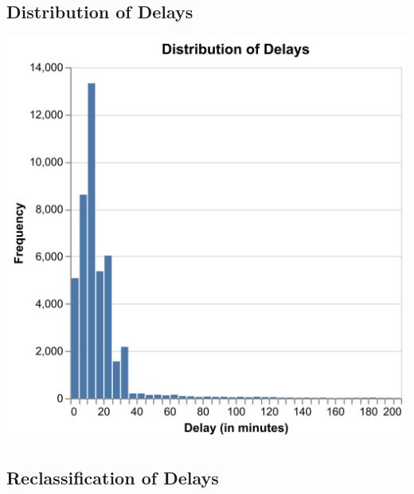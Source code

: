 \documentclass[
  letterpaper,
  DIV=11,
  numbers=noendperiod]{scrartcl}
\begin{document}
\subsection{Distribution of Delays}\label{distribution-of-delays}

\begin{center}
\includegraphics{notebooks/delay_dist.png}
\end{center}

\subsection{Reclassification of
Delays}\label{reclassification-of-delays}
\end{document}
